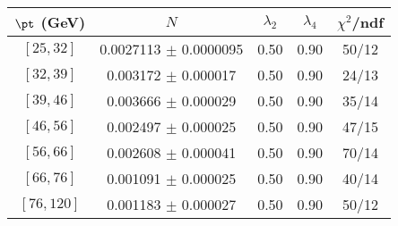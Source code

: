 \begin{tabular}{c||c|c|c|c}
$\pt$ (GeV) & $N$ & $\lambda_{2}$ & $\lambda_4$  & $\chi^2$/ndf  \\
\hline
$[25, 32]$ & 0.0027113 $\pm$ 0.0000095 & 0.50 & 0.90 & 50/12\\
$[32, 39]$ & 0.003172 $\pm$ 0.000017 & 0.50 & 0.90 & 24/13\\
$[39, 46]$ & 0.003666 $\pm$ 0.000029 & 0.50 & 0.90 & 35/14\\
$[46, 56]$ & 0.002497 $\pm$ 0.000025 & 0.50 & 0.90 & 47/15\\
$[56, 66]$ & 0.002608 $\pm$ 0.000041 & 0.50 & 0.90 & 70/14\\
$[66, 76]$ & 0.001091 $\pm$ 0.000025 & 0.50 & 0.90 & 40/14\\
$[76, 120]$ & 0.001183 $\pm$ 0.000027 & 0.50 & 0.90 & 50/12\\
\end{tabular}
